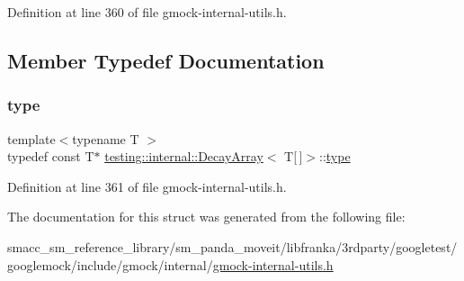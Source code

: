 Definition at line 360 of file gmock-\/internal-\/utils.\+h.



\subsection{Member Typedef Documentation}
\mbox{\label{structtesting_1_1internal_1_1DecayArray_3_01T[]_4_a1820b673d104b3a985faaef8db5d77d2}} 
\subsubsection{\texorpdfstring{type}{type}}
{\footnotesize\ttfamily template$<$typename T $>$ \\
typedef const T$\ast$ \hyperlink{structtesting_1_1internal_1_1DecayArray}{testing\+::internal\+::\+Decay\+Array}$<$ T\mbox{[}$\,$\mbox{]}$>$\+::\hyperlink{structtesting_1_1internal_1_1DecayArray_3_01T[]_4_a1820b673d104b3a985faaef8db5d77d2}{type}}



Definition at line 361 of file gmock-\/internal-\/utils.\+h.



The documentation for this struct was generated from the following file\+:\begin{DoxyCompactItemize}
\item 
smacc\+\_\+sm\+\_\+reference\+\_\+library/sm\+\_\+panda\+\_\+moveit/libfranka/3rdparty/googletest/googlemock/include/gmock/internal/\hyperlink{gmock-internal-utils_8h}{gmock-\/internal-\/utils.\+h}\end{DoxyCompactItemize}
